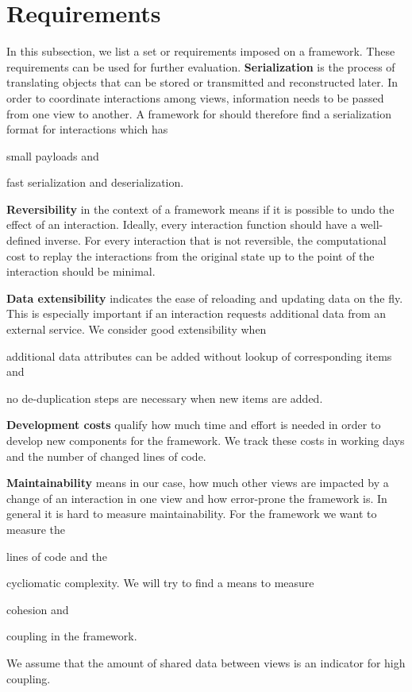 \section{Requirements}
In this subsection, we list a set or requirements imposed on a \cmv{} framework.
These requirements can be used for further evaluation.
\textbf{Serialization} is the process of translating objects that can be stored or transmitted and reconstructed later.
In order to coordinate interactions among views, information needs to be passed from one view to another.
A framework for \cmvs{} should therefore find a serialization format for interactions which has
\begin{enumerate*}[label=(\arabic*)]
  \item
    small payloads and
  \item 
    fast serialization and deserialization.
\end{enumerate*}

\textbf{Reversibility} in the context of a \cmv{} framework means if it is possible to undo the effect of an interaction.
Ideally, every interaction function should have a well-defined inverse.
For every interaction that is not reversible, the computational cost to replay the interactions from the original state up to the point of the interaction should be minimal.

\textbf{Data extensibility} indicates the ease of reloading and updating data on the fly.
This is especially important if an interaction requests additional data from an external service.
We consider good extensibility when
\begin{enumerate*}[label=(\arabic*)]
  \item
    additional data attributes can be added without lookup of corresponding items and
  \item
    no de-duplication steps are necessary when new items are added.
\end{enumerate*}

\textbf{Development costs} qualify how much time and effort is needed in order to develop new components for the \cmv{} framework.
We track these costs in working days and the number of changed lines of code.


\textbf{Maintainability} means in our case, how much other views are impacted by a change of an interaction in one view and how error-prone the framework is.
In general it is hard to measure maintainability.
For the \cmv{} framework we want to measure the
\begin{enumerate*}[label=(\arabic*)]
  \item
    lines of code and the
  \item
    cycliomatic complexity. We will try to find a means to measure
  \item
    cohesion and
  \item
    coupling in the framework.
\end{enumerate*}
We assume that the amount of shared data between views is an indicator for high coupling.



